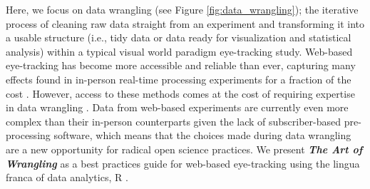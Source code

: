 Here, we focus on data wrangling (see Figure \ref{fig:data_wrangling}); the iterative process of cleaning raw data straight from an experiment and transforming it into a usable structure (i.e., tidy data or data ready for visualization and statistical analysis) within a typical visual world paradigm eye-tracking study. Web-based eye-tracking has become more accessible and reliable than ever, capturing many effects found in in-person real-time processing experiments for a fraction of the cost \parencite[e.g.,][]{Vos_2017,Semmelmann_2017,Prystauka_Altmann_Rothman_2023,Degen_Seeing_2021}. However, access to these methods comes at the cost of requiring expertise in data wrangling \parencite[e.g., ][]{Vos_2017,Prystauka_Altmann_Rothman_2023}. Data from web-based experiments are currently even more complex than their in-person counterparts given the lack of subscriber-based pre-processing software, which means that the choices made during data wrangling are a new opportunity for radical open science practices. We present \textit{\textbf{The Art of Wrangling}} as a best practices guide for web-based eye-tracking using the lingua franca of data analytics, R \parencite{mizumoto_r_2015, R}. 
\newline
\newline